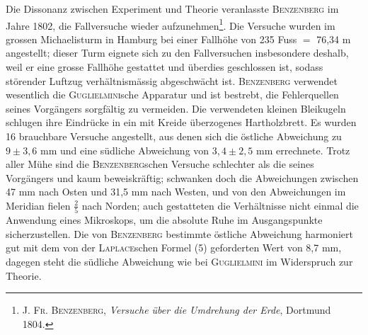 Die Dissonanz zwischen Experiment und Theorie veranlasste \textsc{Benzenberg}
im Jahre 1802, die Fallversuche wieder aufzunehmen\footnote{\textsc{J. Fr. Benzenberg}, \textit{Versuche über die Umdrehung der Erde}, Dortmund 1804.}. Die Versuche wurden
im grossen Michaelisturm in Hamburg bei einer Fallhöhe von 235 Fuss $=$
76,34 m angestellt; dieser Turm eignete sich zu den Fallversuchen insbesondere
deshalb, weil er eine grosse Fallhöhe gestattet und überdies geschlossen ist,
sodass störender Luftzug verhältnismässig abgeschwächt ist. \textsc{Benzenberg} verwendet
wesentlich die \textsc{Guglielmini}sche Apparatur und ist bestrebt, die Fehlerquellen
seines Vorgängers sorgfältig zu vermeiden. Die verwendeten kleinen
Bleikugeln schlugen ihre Eindrücke in ein mit Kreide überzogenes Hartholzbrett.
Es wurden 16 brauchbare Versuche angestellt, aus denen sich die
östliche Abweichung zu $9\pm3{,}6$ mm und eine südliche Abweichung von
$3{,}4\pm2{,}5$ mm errechnete. Trotz aller Mühe sind die \textsc{Benzenberg}schen Versuche
schlechter als die seines Vorgängers und kaum beweiskräftig; schwanken
doch die Abweichungen zwischen 47 mm nach Osten und 31,5 mm nach
Westen, und von den Abweichungen im Meridian fielen $\frac{2}{5}$ nach Norden;
auch gestatteten die Verhältnisse nicht einmal die Anwendung eines Mikroskops,
um die absolute Ruhe im Ausgangspunkte sicherzustellen. Die von
\textsc{Benzenberg} bestimmte östliche Abweichung harmoniert gut mit dem von der
\textsc{Laplace}schen Formel (5) geforderten Wert von 8,7 mm, dagegen steht die
südliche Abweichung wie bei \textsc{Guglielmini} im Widerspruch zur Theorie.

